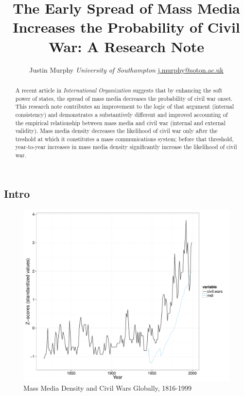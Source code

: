 \documentclass[11pt,article,oneside]{memoir}
\title{The Early Spread of Mass Media Increases the Probability of Civil War: A
Research Note}
\author{\Large Justin Murphy\vspace{0.05in} \newline\normalsize\emph{University of Southampton} \newline\footnotesize \url{j.murphy@soton.ac.uk}\vspace*{0.2in}\newline }
\date{}
\makeatletter
\def\maxwidth{\ifdim\Gin@nat@width>\linewidth\linewidth
\else\Gin@nat@width\fi}
\let\Oldincludegraphics\includegraphics
\renewcommand{\includegraphics}[1]{\Oldincludegraphics[width=\maxwidth]{#1}}
\makeatother
\begin{document}
  
\setsansfont[Mapping=tex-text]{Gill Sans} 
\setmonofont[Mapping=tex-text,Scale=0.8]{Consolas}
\pagestyle{kjh}

\singlespacing


\maketitle



\vspace{-4ex}
\begin{abstract}

\noindent A recent article in \emph{International Organization} suggests that by
enhancing the soft power of states, the spread of mass media decreases
the probability of civil war onset. This research note contributes an
improvement to the logic of that argument (internal consistency) and
demonstrates a substantively different and improved accounting of the
empirical relationship between mass media and civil war (internal and
external validity). Mass media density decreases the likelihood of civil
war only after the treshold at which it constitutes a mass
communications system; before that threshold, year-to-year increases in
mass media density significantly increase the likelihood of civil war.

\end{abstract}

\newpage


\onehalfspacing

\subsection{Intro}\label{intro}

\begin{figure}[htbp]
\centering
\includegraphics{figure/globalplot.pdf}
\caption{Mass Media Density and Civil Wars Globally, 1816-1999}
\end{figure}
\end{document}
